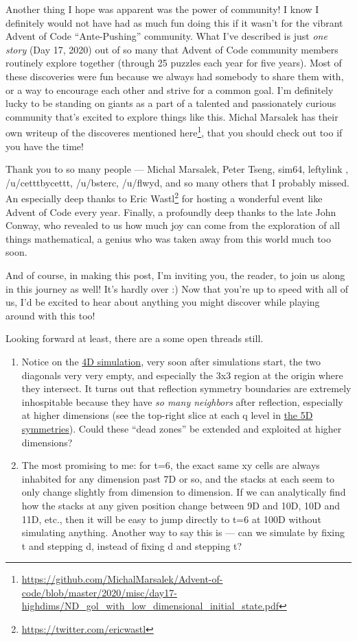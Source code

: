 \documentclass[]{article}
\renewcommand{\href}[2]{#2\footnote{\url{#1}}}
\begin{document}
Another thing I hope was apparent was the power of community! I know I
definitely would not have had as much fun doing this if it wasn't for the
vibrant Advent of Code ``Ante-Pushing'' community. What I've described is just
\emph{one story} (Day 17, 2020) out of so many that Advent of Code community
members routinely explore together (through 25 puzzles each year for five
years). Most of these discoveries were fun because we always had somebody to
share them with, or a way to encourage each other and strive for a common goal.
I'm definitely lucky to be standing on giants as a part of a talented and
passionately curious community that's excited to explore things like this.
Michal Marsalek
\href{https://github.com/MichalMarsalek/Advent-of-code/blob/master/2020/misc/day17-highdims/ND_gol_with_low_dimensional_initial_state.pdf}{has
their own writeup of the discoveres mentioned here}, that you should check out
too if you have the time!

Thank you to so many people --- Michal Marsalek, Peter Tseng, sim64, leftylink ,
/u/cetttbycettt, /u/bsterc, /u/flwyd, and so many others that I probably missed.
An especially deep thanks to \href{https://twitter.com/ericwastl}{Eric Wastl}
for hosting a wonderful event like Advent of Code every year. Finally, a
profoundly deep thanks to the late John Conway, who revealed to us how much joy
can come from the exploration of all things mathematical, a genius who was taken
away from this world much too soon.

And of course, in making this post, I'm inviting you, the reader, to join us
along in this journey as well! It's hardly over :) Now that you're up to speed
with all of us, I'd be excited to hear about anything you might discover while
playing around with this too!

Looking forward at least, there are a some open threads still.

\begin{enumerate}
\def\labelenumi{\arabic{enumi}.}
\tightlist
\item
  Notice on the \protect\hyperlink{gol4D}{4D simulation}, very soon after
  simulations start, the two diagonals very very empty, and especially the 3x3
  region at the origin where they intersect. It turns out that reflection
  symmetry boundaries are extremely inhospitable because they have \emph{so many
  neighbors} after reflection, especially at higher dimensions (see the
  top-right slice at each q level in \protect\hyperlink{golSyms5D}{the 5D
  symmetries}). Could these ``dead zones'' be extended and exploited at higher
  dimensions?
\item
  The most promising to me: for t=6, the exact same xy cells are always
  inhabited for any dimension past 7D or so, and the stacks at each seem to only
  change slightly from dimension to dimension. If we can analytically find how
  the stacks at any given position change between 9D and 10D, 10D and 11D, etc.,
  then it will be easy to jump directly to t=6 at 100D without simulating
  anything. Another way to say this is --- can we simulate by fixing t and
  stepping d, instead of fixing d and stepping t?
\end{enumerate}
\end{document}

